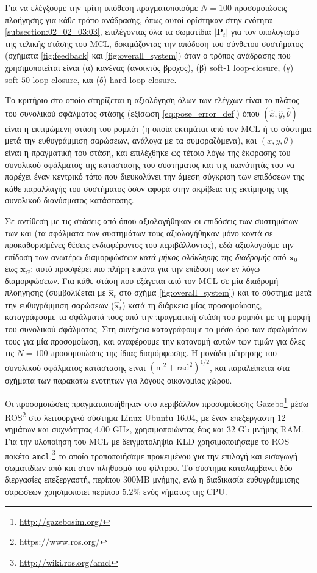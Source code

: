 Για να ελέγξουμε την τρίτη υπόθεση πραγματοποιούμε $N=100$ προσομοιώσεις
πλοήγησης για κάθε τρόπο ανάδρασης, όπως αυτοί ορίστηκαν στην ενότητα
\ref{subsection:02_02_03:03}, επιλέγοντας όλα τα σωματίδια $|\bm{P}_t|$ για τον
υπολογισμό της τελικής στάσης του MCL, δοκιμάζοντας την απόδοση του σύνθετου
συστήματος (σχήματα \ref{fig:feedback} και \ref{fig:overall_system}) όταν ο
τρόπος ανάδρασης που χρησιμοποιείται είναι (α) κανένας (ανοικτός βρόχος), (β)
soft-$1$ loop-closure, (γ) soft-$50$ loop-closure, και (δ) hard loop-closure.

Το κριτήριο στο οποίο στηρίζεται η αξιολόγηση όλων των ελέγχων είναι το πλάτος
του συνολικού σφάλματος στάσης (εξίσωση \ref{eq:pose_error_def}) όπου
$(\hat{x}, \hat{y}, \hat{\theta})$ είναι η εκτιμώμενη στάση του ρομπότ (η οποία
εκτιμάται από τον MCL ή το σύστημα μετά την ευθυγράμμιση σαρώσεων, ανάλογα με
τα συμφραζόμενα), και $(x,y,\theta)$ είναι η πραγματική του στάση, και
επιλέχθηκε ως τέτοιο λόγω της έκφρασης του συνολικού σφάλματος της κατάστασης
του συστήματος και της ικανότητάς του να παρέχει έναν κεντρικό τόπο που
διευκολύνει την άμεση σύγκριση των επιδόσεων της κάθε παραλλαγής του συστήματος
όσον αφορά στην ακρίβεια της εκτίμησης της συνολικού διανύσματος κατάστασης.

Σε αντίθεση με τις στάσεις από όπου αξιολογήθηκαν οι επιδόσεις των συστημάτων
των \cite{Rowekamper2012a} και \cite{Vasiljevic2016a} (τα σφάλματα των
συστημάτων τους αξιολογήθηκαν μόνο κοντά σε προκαθορισμένες θέσεις
ενδιαφέροντος του περιβάλλοντος), εδώ αξιολογούμε την επίδοση των ανωτέρω
διαμορφώσεων \textit{κατά μήκος ολόκληρης της διαδρομής} από $\bm{x}_0$ έως
$\bm{x}_G$: αυτό προσφέρει πιο πλήρη εικόνα για την επίδοση των εν λόγω
διαμορφώσεων.  Για κάθε στάση που εξάγεται από τον MCL σε μία διαδρομή
πλοήγησης (συμβολίζεται με $\hat{\bm{x}}_t$ στο σχήμα \ref{fig:overall_system})
και το σύστημα μετά την ευθυγράμμιση σαρώσεων ($\hat{\bm{x}}^{\prime}_t$) κατά
τη διάρκεια μίας προσομοίωσης, καταγράφουμε τα σφάλματά τους από την πραγματική
στάση του ρομπότ με τη μορφή του συνολικού σφάλματος. Στη συνέχεια καταγράφουμε
το μέσο όρο των σφαλμάτων τους για μία προσομοίωση, και αναφέρουμε την κατανομή
αυτών των τιμών για όλες τις $N = 100$ προσομοιώσεις της ίδιας διαμόρφωσης. Η
μονάδα μέτρησης του συνολικού σφάλματος κατάστασης είναι
$(\text{m}^2+\text{rad}^2)^{1/2}$, και παραλείπεται στα σχήματα των παρακάτω
ενοτήτων για λόγους οικονομίας χώρου.

Οι προσομοιώσεις πραγματοποιήθηκαν στο περιβάλλον προσομοίωσης
Gazebo\footnote{\url{http://gazebosim.org/}} μέσω
ROS\footnote{\url{https://www.ros.org/}} στο λειτουργικό σύστημα Linux Ubuntu
16.04, με έναν επεξεργαστή $12$ νημάτων και συχνότητας $4.00$ GHz,
χρησιμοποιώντας έως και $32$ Gb μνήμης RAM. Για την υλοποίηση του MCL με
δειγματοληψία KLD χρησιμοποιήσαμε το ROS πακέτο
\texttt{amcl},\footnote{\url{http://wiki.ros.org/amcl}} το οποίο τροποποιήσαμε
προκειμένου για την επιλογή και εισαγωγή σωματιδίων από και στον πληθυσμό του
φίλτρου. Το σύστημα καταλαμβάνει δύο διεργασίες επεξεργαστή, περίπου 300MB
μνήμης, ενώ η διαδικασία ευθυγράμμισης σαρώσεων χρησιμοποιεί περίπου $5.2\%$
ενός νήματος της CPU.


